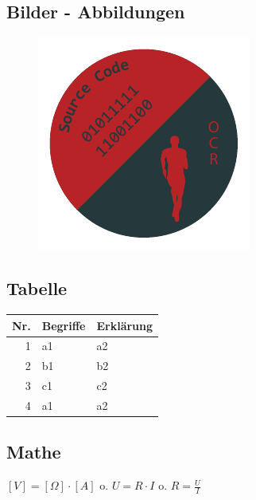 \subsection{Bilder - Abbildungen}\label{bilder-abbildungen}

\begin{figure}[H]%
	\centering
	\includegraphics[width=.55\textwidth]{images/logo.pdf}
\end{figure}

\subsection{Tabelle}\label{tabelle}

	\begin{table}[H]%
	\centering 
	\sffamily\footnotesize 
	\begin{tabular}{@{}rll@{}}
	\toprule 
\textbf{Nr.} & \textbf{Begriffe} & \textbf{Erklärung}\\
	\midrule
1 & a1 & a2\\
2 & b1 & b2\\
3 & c1 & c2\\
4 & a1 & a2\\
	\bottomrule
 \end{tabular}%
\end{table}

\subsection{Mathe}\label{mathe}

$[ V ] = [ \Omega ] \cdot [ A ]$ o. $U = R \cdot I$ o.
$R = \frac{U}{I}$

